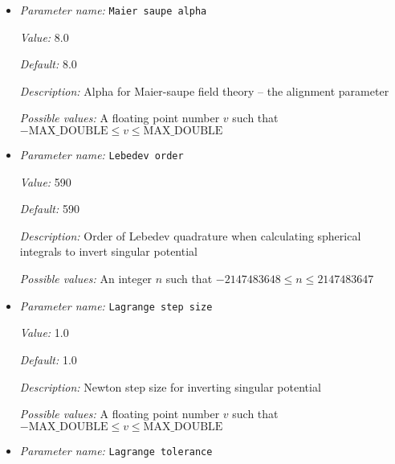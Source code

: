 \begin{itemize}
\item {\it Parameter name:} {\tt Maier saupe alpha}
\label{parameters:Nematic system MPI/Field theory/Maier saupe/Maier saupe alpha}
\label{parameters:Nematic_20system_20MPI/Field_20theory/Maier_20saupe/Maier_20saupe_20alpha}


{\it Value:} 8.0


{\it Default:} 8.0


{\it Description:} Alpha for Maier-saupe field theory -- the alignment parameter


{\it Possible values:} A floating point number $v$ such that $-\text{MAX\_DOUBLE} \leq v \leq \text{MAX\_DOUBLE}$
\item {\it Parameter name:} {\tt Lebedev order}
\label{parameters:Nematic system MPI/Field theory/Maier saupe/Lebedev order}
\label{parameters:Nematic_20system_20MPI/Field_20theory/Maier_20saupe/Lebedev_20order}


{\it Value:} 590


{\it Default:} 590


{\it Description:} Order of Lebedev quadrature when calculating spherical integrals to invert singular potential


{\it Possible values:} An integer $n$ such that $-2147483648\leq n \leq 2147483647$
\item {\it Parameter name:} {\tt Lagrange step size}
\label{parameters:Nematic system MPI/Field theory/Maier saupe/Lagrange step size}
\label{parameters:Nematic_20system_20MPI/Field_20theory/Maier_20saupe/Lagrange_20step_20size}


{\it Value:} 1.0


{\it Default:} 1.0


{\it Description:} Newton step size for inverting singular potential


{\it Possible values:} A floating point number $v$ such that $-\text{MAX\_DOUBLE} \leq v \leq \text{MAX\_DOUBLE}$
\item {\it Parameter name:} {\tt Lagrange tolerance}
\label{parameters:Nematic system MPI/Field theory/Maier saupe/Lagrange tolerance}
\label{parameters:Nematic_20system_20MPI/Field_20theory/Maier_20saupe/Lagrange_20tolerance}



\end{itemize}
